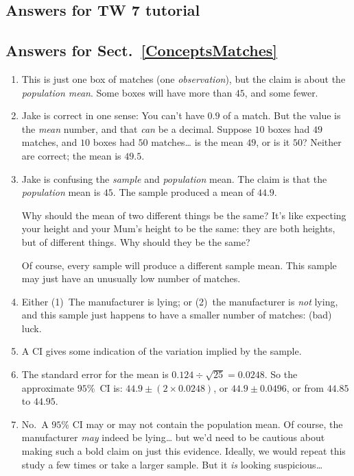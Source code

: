 \documentclass[
  11pt,
  a4paper,
  krantz2]{krantz}
\begin{document}
\begin{footnotesize}
\section{Answers for TW 7 tutorial}\label{Lecture7Answers}

\subsection*{Answers for Sect.~\ref{ConceptsMatches}}\label{answers-for-sect.-refconceptsmatches}

\begin{enumerate}
\def\labelenumi{\arabic{enumi}.}
\item
  This is just one box of matches (one \emph{observation}), but the claim is about the \emph{population mean}.
  Some boxes will have more than \(45\), and some fewer.
\item
  Jake is correct in one sense: You can't have \(0.9\) of a match.
  But the value is the \emph{mean} number, and that \emph{can} be a decimal.
  Suppose \(10\) boxes had \(49\) matches, and \(10\) boxes had \(50\) matches\ldots{} is the mean \(49\), or is it \(50\)?
  Neither are correct; the mean is \(49.5\).
\item
  Jake is confusing the \emph{sample} and \emph{population} mean.
  The claim is that the \emph{population} mean is \(45\).
  The sample produced a mean of \(44.9\).

  Why should the mean of two different things be the same?
  It's like expecting your height and your Mum's height to be the same:
  they are both heights, but of different things.
  Why should they be the same?

  Of course, every sample will produce a different sample mean.
  This sample may just have an unusually low number of matches.
\item
  Either (1)~The manufacturer is lying; or (2)~the manufacturer is \emph{not} lying, and this sample just happens to have a smaller number of matches: (bad) luck.
\item
  A CI gives some indication of the variation implied by the sample.
\item
  The standard error for the mean is \(0.124\div\sqrt{25} = 0.0248\).
  So the approximate \(95\)\%~CI is: \(44.9 \pm (2\times 0.0248)\), or \(44.9\pm 0.0496\), or from \(44.85\) to \(44.95\).
\item
  No.~A \(95\)\% CI may or may not contain the population mean.
  Of course, the manufacturer \emph{may} indeed be lying\ldots{}
  but we'd need to be cautious about making such a bold claim on just this evidence.
  Ideally, we would repeat this study a few times or take a larger sample.
  But it \emph{is} looking suspicious\ldots{}


\end{enumerate}
\end{footnotesize}
\end{document}
